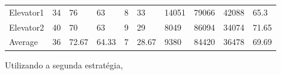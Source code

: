 \documentclass[a4paper]{article}
\begin{document}
\begin{table}[h]
\begin{tabular}{@{}llllllllll@{}}
Elevator1 & 34        & 76            & 63           & 8                                                               & 33                                                                  & 14051                                                         & 79066                                                 & 42088                                                   & 65.3        \\
Elevator2 & 40        & 70            & 63           & 9                                                               & 29                                                                  & 8049                                                         & 86094                                                 & 34074                                                   & 71.65         \\
Average   & 36     & 72.67         & 64.33        & 7                                                               & 28.67                                                               & 9380                                                         & 84420                                                 & 36478                                                   & 69.69          \\ \bottomrule
\end{tabular}
\end{table}

Utilizando a segunda estratégia,
\end{document}
